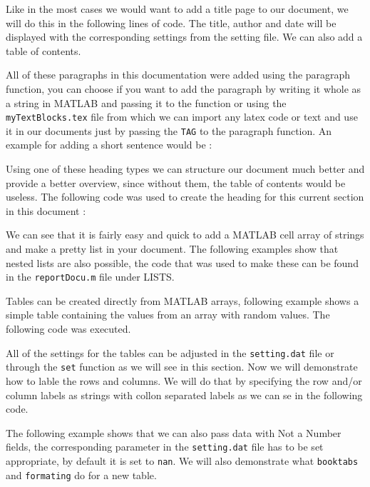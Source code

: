 
Like in the most cases we would want to add a title page to our document, we will do this in the following
lines of code. The title, author and date will be displayed with the corresponding settings from the 
setting file. We can also add a table of contents.


All of these paragraphs in this documentation were added using the paragraph function, you can choose if you
want to add the paragraph by writing it whole as a string in MATLAB and passing it to the function or using
the {\tt myTextBlocks.tex} file from which we can import any latex code or text and use it in our documents 
just by passing the {\tt TAG} to the paragraph function. 
An example for adding a short sentence would be : 


Using one of these heading types we can structure our document much better and provide a better overview, since
without them, the table of contents would be useless. The following code was used to create the heading for this
current section in this document :


We can see that it is fairly easy and quick to add a MATLAB cell array of strings and make a pretty list in 
your document. The following examples show that nested lists are also possible, the code that was used to make these 
can be found in the {\tt reportDocu.m} file under LISTS. 


Tables can be created directly from MATLAB arrays, following example shows a simple table containing the values 
from an array with random values. The following code was executed.


All of the settings for the tables can be adjusted in the {\tt setting.dat} file or through the {\tt set} 
function as we will see in this section. Now we will demonstrate how to lable the rows and columns. We will
do that by specifying the row and/or column labels as strings with collon separated labels as we can se in 
the following code. 


The following example shows that we can also pass data with Not a Number fields, the corresponding parameter 
in the {\tt setting.dat} file has to be set appropriate, by default it is set to {\tt nan}. We will also demonstrate 
what {\tt booktabs} and {\tt formating} do for a new table.


